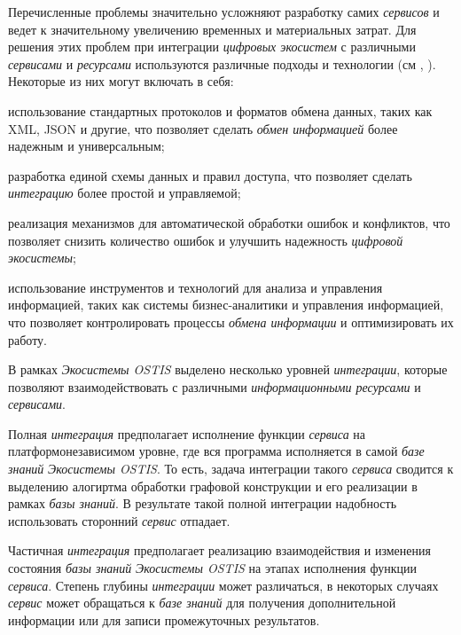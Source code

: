 Перечисленные проблемы значительно усложняют разработку самих \textit{сервисов} и ведет к значительному увеличению временных и материальных затрат. Для решения этих проблем при интеграции \textit{цифровых экосистем} с различными \textit{сервисами} и \textit{ресурсами} используются различные подходы и технологии (см , ). Некоторые из них могут включать в себя:

\begin{textitemize}
\item использование стандартных протоколов и форматов обмена данных, таких как XML, JSON и другие, что позволяет сделать \textit{обмен информацией} более надежным и универсальным;
\item разработка единой схемы данных и правил доступа, что позволяет сделать \textit{интеграцию} более простой и управляемой;
\item реализация механизмов для автоматической обработки ошибок и конфликтов, что позволяет снизить количество ошибок и улучшить надежность \textit{цифровой экосистемы};
\item использование инструментов и технологий для анализа и управления информацией, таких как системы бизнес-аналитики и управления информацией, что позволяет контролировать процессы \textit{обмена информации} и оптимизировать их работу.
\end{textitemize}


В рамках \textit{Экосистемы OSTIS} выделено несколько уровней \textit{интеграции}, которые позволяют взаимодействовать с различными \textit{информационными ресурсами} и \textit{сервисами}. 

Полная \textit{интеграция} предполагает исполнение функции \textit{сервиса} на платформонезависимом уровне, где вся программа исполняется в самой \textit{базе знаний} \textit{Экосистемы OSTIS}. То есть, задача интеграции такого \textit{сервиса} сводится к выделению алогиртма обработки графовой конструкции и его реализации в рамках \textit{базы знаний}. В результате такой полной интеграции надобность использовать сторонний \textit{сервис} отпадает. 

Частичная \textit{интеграция} предполагает реализацию взаимодействия и изменения состояния \textit{базы знаний} \textit{Экосистемы OSTIS} на этапах исполнения функции \textit{сервиса}. Степень глубины \textit{интеграции} может различаться, в некоторых случаях \textit{сервис} может обращаться к \textit{базе знаний} для получения дополнительной информации или для записи промежуточных результатов. 

